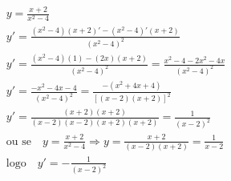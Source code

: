 \begin{ex}
\begin{align}
&y=\frac{x+2}{x^2-4}\nonumber\\
&y'=\frac{(x^2-4)(x+2)'-(x^2-4)'(x+2)}{(x^2-4)^2}\nonumber\\
&y'=\frac{(x^2-4)(1)-(2x)(x+2)}{(x^2-4)^2}=\frac{x^2-4-2x^2-4x}{(x^2-4)^2}\nonumber\\
&y'=\frac{-x^2-4x-4}{(x^2-4)^2}=\frac{-(x^2+4x+4)}{[(x-2)(x+2)]^2}\nonumber\\
&y'=\frac{(x+2)(x+2)}{(x-2)(x-2)(x+2)(x+2)}=\frac{1}{(x-2)^2}\nonumber\\
&\text{ou se}\quad y=\frac{x+2}{x^2-4} \Rightarrow y=\frac{x+2}{(x-2)(x+2)}=\frac{1}{x-2}\nonumber\\
&\text{logo}\quad y'=-\frac{1}{(x-2)^2}\nonumber
\end{align}
\end{ex}